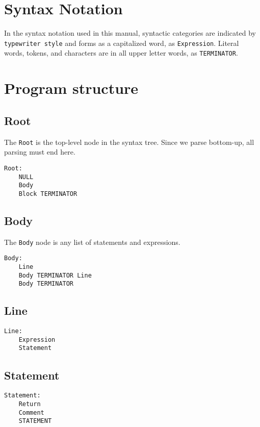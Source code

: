 \documentclass[10pt]{report}
\begin{document}
\section{Syntax Notation}
\label{sec:syn_notation}

In the syntax notation used in this manual, syntactic categories are indicated by \texttt{typewriter style} and forms as a capitalized word, as \texttt{Expression}. Literal words, tokens, and characters are in all upper letter words, as \texttt{TERMINATOR}.

\section{Program structure}
\label{sec:structure}

\subsection{Root}

The \texttt{Root} is the top-level node in the syntax tree. Since we parse bottom-up, all parsing must end here.
\begin{verbatim}
Root:
    NULL
    Body
    Block TERMINATOR
\end{verbatim}

\subsection{Body}

The \texttt{Body} node is any list of statements and expressions.
\begin{verbatim}
Body:
    Line
    Body TERMINATOR Line
    Body TERMINATOR
\end{verbatim}

\subsection{Line}

\begin{verbatim}
Line:
    Expression
    Statement
\end{verbatim}

\subsection{Statement}

\begin{verbatim}
Statement:
    Return
    Comment
    STATEMENT
\end{verbatim}
\end{document}
